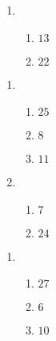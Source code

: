 \documentclass[12pt,twoside]{article}
\makeatletter
\def\emptycleardoublepage{\clearpage\if@twoside \ifodd\c@page\else
\thispagestyle{empty}%
\hbox{}\newpage\if@twocolumn\hbox{}\newpage\fi\fi\fi}
\makeatother
\begin{document}
\begin{multicols}{2}
\begin{enumerate}
\item \begin{enumerate}
\def \a{4}\def \b{9}\def \ab{13}
\item $\ab$
\def \a{6}\def \b{16}\def \apb{22}
\item $\apb$
\def \vshift{-3}\def \hshift{-4}\def \chang{-2}\def \findval{-6}\def \yval{1}
\end{enumerate}
\end{enumerate}\end{multicols}\emptycleardoublepage{}\graphicspath{{/Users/jilan/Downloads/Randomizer/Randomizer/Sample Course/Sample Assessment 2/}}\begin{multicols}{2} \begin{enumerate}
\item \begin{enumerate}
\def \a{9}\def \b{16}\def \apb{25}
\item $\apb$
\def \a{13}\def \dif{8}\def \b{5}
\item $\dif$
\def \a{2}\def \b{9}\def \ab{11}
\item $\ab$
\def \vshift{-3}\def \hshift{4}\def \chang{1}\def \findval{5}\def \yval{-5}
\end{enumerate}

\item \begin{enumerate}
\def \a{11}\def \dif{7}\def \b{4}
\item $\dif$
\def \a{6}\def \b{18}\def \apb{24}
\item $\apb$
\def \vshift{-1}\def \hshift{0}\def \chang{2}\def \findval{2}\def \yval{-5}
\end{enumerate}
\end{enumerate}\end{multicols}\emptycleardoublepage{}\graphicspath{{/Users/jilan/Downloads/Randomizer/Randomizer/Sample Course/Sample Assessment 2/}}\begin{multicols}{2} \begin{enumerate}
\item \begin{enumerate}
\def \a{9}\def \b{18}\def \apb{27}
\item $\apb$
\def \a{13}\def \dif{6}\def \b{7}
\item $\dif$
\def \a{3}\def \b{7}\def \ab{10}
\item $\ab$
\def \vshift{-1}\def \hshift{4}\def \chang{0}\def \findval{4}\def \yval{-1}
\end{enumerate}


\end{enumerate}
\end{multicols}
\end{document}
